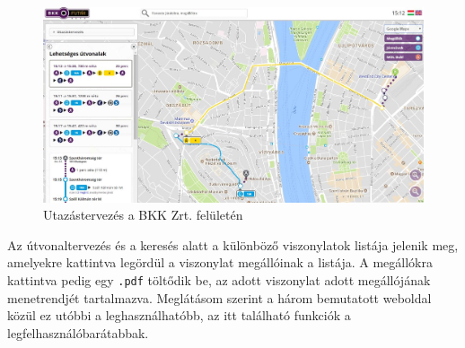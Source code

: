 \begin{figure}[h!]
\centering
\includegraphics[scale=0.4]{kepek/bkk_terkep.jpg}
\caption{Utazástervezés a BKK Zrt. felületén}
\label{fig:bkk_terkep}
\end{figure}

Az útvonaltervezés és a keresés alatt a különböző viszonylatok listája jelenik meg, amelyekre kattintva legördül a viszonylat megállóinak a listája. A megállókra kattintva pedig egy \texttt{.pdf} töltődik be, az adott viszonylat adott megállójának menetrendjét tartalmazva.
Meglátásom szerint a három bemutatott weboldal közül ez utóbbi a leghasználhatóbb, az itt található funkciók a legfelhasználóbarátabbak.
